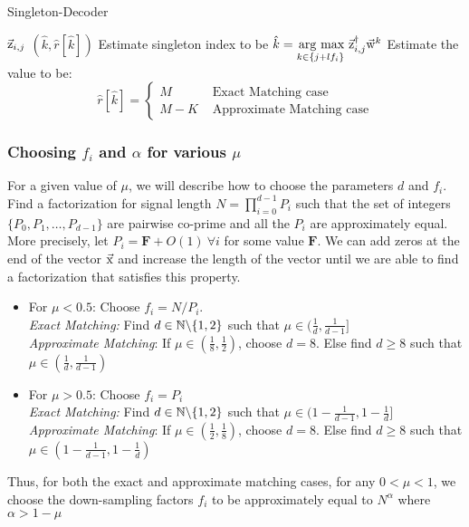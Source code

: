 \begin{algorithm}[h!]
\caption{Singleton-Decoder}
\label{Algo:SingletonDecoder}
\begin{algorithmic}
 $\vec{\mathrm{z}}_{i,j}$
\vspace{\gap}
 $(\hat{k},\hat{r}[\hat{k}])$
\vspace{\gap}
\State Estimate singleton index to be $ \hat{k} = \underset{k\in\{j+l f_i\}}{\operatorname*{\,arg\ max}}\  \vec{\mathrm{z}}^{\dagger}_{i,j} \vec{\mathrm{w}}^{k}$
\vspace{\gap}
  \State Estimate the value to be:$$ \hat{r}[\hat{k}]=
   \begin{cases}
   M & \text{ Exact Matching case}\\
  M-K & \text{ Approximate Matching case}
  \end{cases}
  $$
\end{algorithmic}
\end{algorithm}

\subsubsection{Choosing $f_i$ and $\alpha$ for various $\mu$}
\label{subsec:DesignParameters}

For a given value of $\mu$, we will describe how to choose the parameters $d$ and $f_i$. Find a factorization for signal length $N=\prod_{i=0}^{d-1} P_i$ such that the set of integers $\{P_0,P_1,\ldots,P_{d-1}\}$ are pairwise co-prime and all the $P_i$ are approximately equal. More precisely, let $P_i=\mathbf{F}+O(1) ~\forall i$ for some value $\mathbf{F}$. We can add zeros at the end of the vector $\vec{\mathrm{x}}$ and increase the length of the vector until we are able to find a factorization that satisfies this property.
\begin{itemize}
	\item  For $\mu<0.5$: Choose $f_i = N/P_i$. \\
	{\it Exact Matching:} Find $d\in \mathbb{N}\backslash \{1,2\}$ such that $\mu\in(\frac{1}{d},\frac{1}{d-1}]$\\
	{\it Approximate Matching}: If $\mu\in(\frac{1}{8},\frac{1}{2})$, choose $d=8$. Else find $d\geq 8$ such that $\mu\in(\frac{1}{d},\frac{1}{d-1})$\\
    \item For $\mu>0.5$: Choose $f_i = P_i$\\
    {\it Exact Matching:} Find $d\in \mathbb{N}\backslash \{1,2\}$ such that $\mu\in(1-\frac{1}{d-1},1-\frac{1}{d}]$\\
    {\it Approximate Matching}: If $\mu\in(\frac{1}{2},\frac{1}{8})$, choose $d=8$. Else find $d\geq 8$ such that $\mu\in(1-\frac{1}{d-1},1-\frac{1}{d})$\\    	 
\end{itemize}
Thus, for both the exact and approximate matching cases, for any $0<\mu<1$, we choose the down-sampling factors $f_i$ to be approximately equal to $N^{\alpha}$ where $\alpha > 1- \mu$

